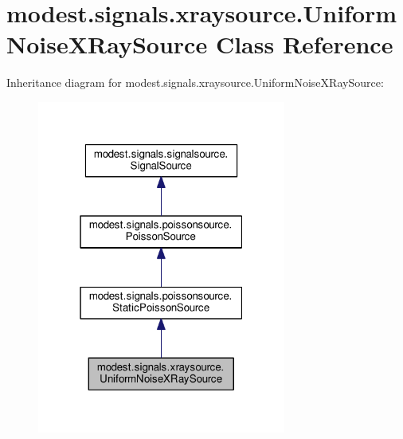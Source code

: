 \hypertarget{classmodest_1_1signals_1_1xraysource_1_1UniformNoiseXRaySource}{}\section{modest.\+signals.\+xraysource.\+Uniform\+Noise\+X\+Ray\+Source Class Reference}
\label{classmodest_1_1signals_1_1xraysource_1_1UniformNoiseXRaySource}


Inheritance diagram for modest.\+signals.\+xraysource.\+Uniform\+Noise\+X\+Ray\+Source\+:
\nopagebreak
\begin{figure}[H]
\begin{center}
\leavevmode
\includegraphics[width=232pt]{classmodest_1_1signals_1_1xraysource_1_1UniformNoiseXRaySource__inherit__graph}
\end{center}
\end{figure}



